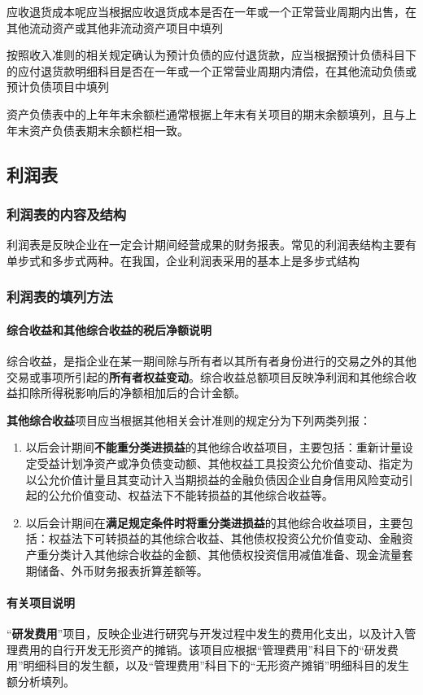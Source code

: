 \documentclass[UTF8,12pt]{ctexart}
\numberwithin{equation}{section} %
\numberwithin{figure}{section}
\numberwithin{table}{section}
\begin{document}
	应收退货成本呢应当根据应收退货成本是否在一年或一个正常营业周期内出售，在其他流动资产或其他非流动资产项目中填列
	
	按照收入准则的相关规定确认为预计负债的应付退货款，应当根据预计负债科目下的应付退货款明细科目是否在一年或一个正常营业周期内清偿，在其他流动负债或预计负债项目中填列
	
	资产负债表中的上年年末余额栏通常根据上年末有关项目的期末余额填列，且与上年末资产负债表期末余额栏相一致。
	
	
	\subsection{利润表}
	\subsubsection{利润表的内容及结构}
	利润表是反映企业在一定会计期间经营成果的财务报表。常见的利润表结构主要有单步式和多步式两种。在我国，企业利润表采用的基本上是多步式结构
	\subsubsection{利润表的填列方法}
	\paragraph{综合收益和其他综合收益的税后净额说明}
	综合收益，是指企业在某一期间除与所有者以其所有者身份进行的交易之外的其他交易或事项所引起的\textbf{所有者权益变动}。综合收益总额项目反映净利润和其他综合收益扣除所得税影响后的净额相加后的合计金额。
	
	
	\textbf{其他综合收益}项目应当根据其他相关会计准则的规定分为下列两类列报：
	\begin{enumerate}
		\item 以后会计期间\textbf{不能重分类进损益}的其他综合收益项目，主要包括：重新计量设定受益计划净资产或净负债变动额、其他权益工具投资公允价值变动、指定为以公允价值计量且其变动计入当期损益的金融负债因企业自身信用风险变动引起的公允价值变动、权益法下不能转损益的其他综合收益等。
		
		\item 以后会计期间在\textbf{满足规定条件时将重分类进损益}的其他综合收益项目，主要包括：权益法下可转损益的其他综合收益、其他债权投资公允价值变动、金融资产重分类计入其他综合收益的金额、其他债权投资信用减值准备、现金流量套期储备、外币财务报表折算差额等。
	\end{enumerate}
	
	\paragraph{有关项目说明}
	“\textbf{研发费用}”项目，反映企业进行研究与开发过程中发生的费用化支出，以及计入管理费用的自行开发无形资产的摊销。该项目应根据“管理费用”科目下的“研发费用”明细科目的发生额，以及“管理费用”科目下的“无形资产摊销”明细科目的发生额分析填列。
	
\end{document}
